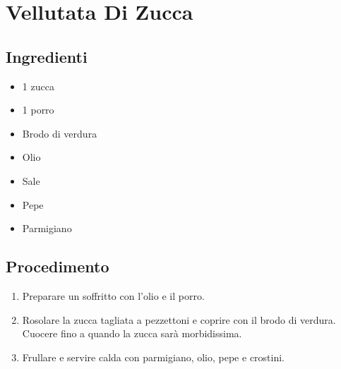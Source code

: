 \section{Vellutata Di Zucca}
\subsection{Ingredienti}
\begin{itemize}
\item 1 zucca  
\item 1 porro  
\item Brodo di verdura  
\item Olio  
\item Sale  
\item Pepe  
\item Parmigiano
\end{itemize}
\subsection{Procedimento}
\begin{enumerate}
\item  Preparare un soffritto con l'olio e il porro.  
\item  Rosolare la zucca tagliata a pezzettoni e coprire con il brodo di verdura. Cuocere fino a quando la zucca sarà morbidissima.  
\item  Frullare e servire calda con parmigiano, olio, pepe e crostini.
\end{enumerate}
